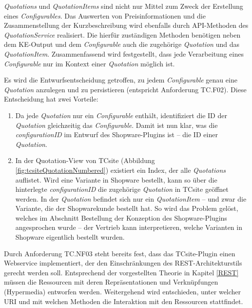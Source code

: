 \documentclass[11pt, a4paper, titlepage, listof=totoc, bibliography=totoc, index=totoc, twoside, openright, headings=normal]{scrreprt}
\begin{document}
\emph{Quotations} und \emph{QuotationItems} sind nicht nur Mittel zum Zweck der Erstellung eines \emph{Configurables}. Das Auswerten von Preisinformationen und die Zusammenstellung der Kurzbeschreibung wird ebenfalls durch API-Methoden des \emph{QuotationService} realisiert. Die hierfür zuständigen Methoden benötigen neben dem KE-Output und dem \emph{Configurable} auch die zugehörige \emph{Quotation} und das \emph{QuotationItem}. Zusammenfassend wird festgestellt, dass jede Verarbeitung eines \emph{Configurable} nur im Kontext einer \emph{Quotation} möglich ist.

Es wird die Entwurfsentscheidung getroffen, zu jedem \emph{Configurable} genau eine \emph{Quotation} anzulegen und zu persistieren (entspricht Anforderung TC.F02). Diese Entscheidung hat zwei Vorteile:
\begin{enumerate}
\item Da jede \emph{Quotation} nur ein \emph{Configurable} enthält, identifiziert die ID der \emph{Quotation} gleichzeitig das \emph{Configurable}. Damit ist nun klar, was die \emph{configurationID} im Entwurf des Shopware-Plugins ist -- die ID einer \emph{Quotation}.
\item In der Quotation-View von TCsite (Abbildung \ref{fig:tcsiteQuotationNumbered}) existiert ein Index, der alle \emph{Quotations} auflistet. Wird eine Variante in Shopware bestellt, kann so über die hinterlegte \emph{configurationID} die zugehörige \emph{Quotation} in TCsite geöffnet werden. In der \emph{Quotation} befindet sich nur ein \emph{QuotationItem} -- und zwar die Variante, die der Shopwarekunde bestellt hat. So wird das Problem gelöst, welches im Abschnitt \glqq Bestellung\grqq{} der Konzeption des Shopware-Plugins angesprochen wurde -- der Vertrieb kann interpretieren, welche Varianten in Shopware eigentlich bestellt wurden.
\end{enumerate}

Durch Anforderung TC.NF03 steht bereits fest, dass das TCsite-Plugin einen Webservice implementiert, der den Einschränkungen des REST-Architekturstils gerecht werden soll. Entsprechend der vorgestellten Theorie in Kapitel \ref{REST} müssen die Ressourcen mit deren Repräsentationen und Verknüpfungen (Hypermedia) entworfen werden. Weitergehend wird entschieden, unter welcher URI und mit welchen Methoden die Interaktion mit den Ressourcen stattfindet.
\end{document}

